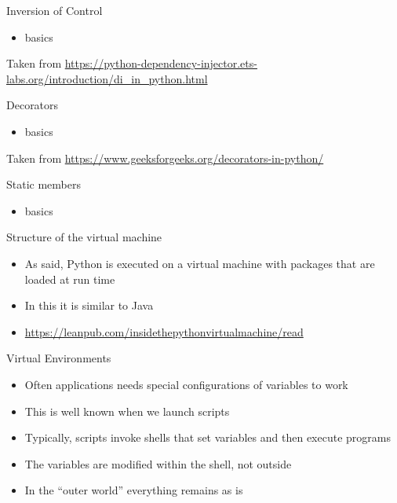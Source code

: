 \documentclass{beamer}
\begin{document}
\begin{frame}
{\centerline{Inversion of Control}}
\begin{itemize}
    \item basics
\end{itemize} 
\begin{center}
    \tiny{Taken from \url{https://python-dependency-injector.ets-labs.org/introduction/di_in_python.html}}
\end{center}

\end{frame}


\begin{frame}
{\centerline{Decorators}}
\begin{itemize}
    \item basics
\end{itemize} 
\begin{center}
    \tiny{Taken from \url{https://www.geeksforgeeks.org/decorators-in-python/}}
\end{center}

\end{frame}


\begin{frame}
{\centerline{Static members}}
\begin{itemize}
    \item basics
\end{itemize} 
\end{frame}



\begin{frame}
{\centerline{Structure of the virtual machine}}
\begin{itemize}
    \item As said, Python is executed on a virtual machine with packages that are loaded at run time
    \item In this it is similar to Java
    \item \url{https://leanpub.com/insidethepythonvirtualmachine/read}
\end{itemize} 
\end{frame}




\begin{frame}
{\centerline{Virtual Environments}}
\begin{itemize}
    \item Often applications needs special configurations of variables to work
    \item This is well known when we launch scripts
    \item Typically, scripts invoke shells that set variables and then execute programs
    \item The variables are modified within the shell, not outside
    \item In the ``outer world'' everything remains as is
\end{itemize} 
\end{frame}
\end{document}

